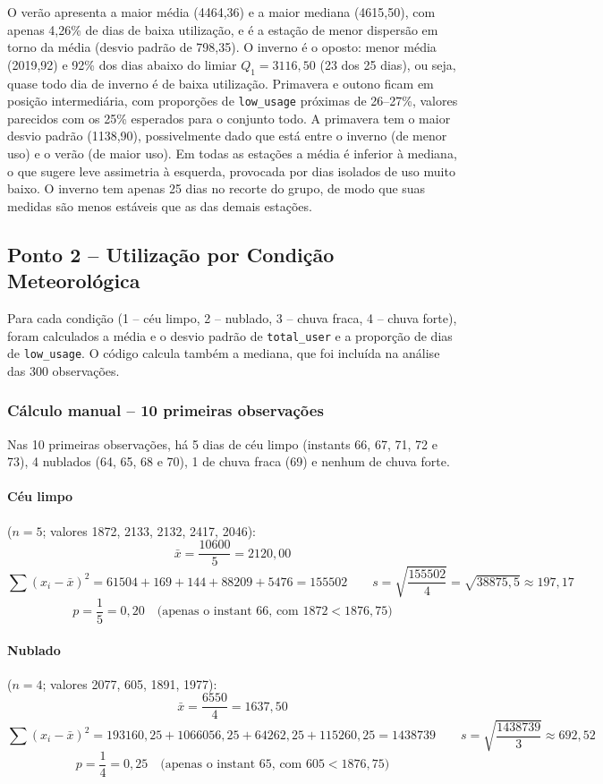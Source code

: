 \documentclass[10pt, a4paper]{article}
\begin{document}
O verão apresenta a maior média (4464,36) e a maior mediana (4615,50), com apenas 4,26\% de dias de baixa utilização, e é a estação de menor dispersão em torno da média (desvio padrão de 798,35). O inverno é o oposto: menor média (2019,92) e 92\% dos dias abaixo do limiar $Q_1 = 3116{,}50$ (23 dos 25 dias), ou seja, quase todo dia de inverno é de baixa utilização. Primavera e outono ficam em posição intermediária, com proporções de \texttt{low\_usage} próximas de 26--27\%, valores parecidos com os 25\% esperados para o conjunto todo. A primavera tem o maior desvio padrão (1138,90), possivelmente dado que está entre o inverno (de menor uso) e o verão (de maior uso). Em todas as estações a média é inferior à mediana, o que sugere leve assimetria à esquerda, provocada por dias isolados de uso muito baixo. O inverno tem apenas 25 dias no recorte do grupo, de modo que suas medidas são menos estáveis que as das demais estações.

\clearpage
\subsection{Ponto 2 -- Utilização por Condição Meteorológica}

Para cada condição (1 -- céu limpo, 2 -- nublado, 3 -- chuva fraca, 4 -- chuva forte), foram calculados a média e o desvio padrão de \texttt{total\_user} e a proporção de dias de \texttt{low\_usage}. O código calcula também a mediana, que foi incluída na análise das 300 observações.

\subsubsection{Cálculo manual -- 10 primeiras observações}

Nas 10 primeiras observações, há 5 dias de céu limpo (instants 66, 67, 71, 72 e 73), 4 nublados (64, 65, 68 e 70), 1 de chuva fraca (69) e nenhum de chuva forte.

\paragraph{Céu limpo} ($n = 5$; valores 1872, 2133, 2132, 2417, 2046):
\[
\bar{x} = \frac{10600}{5} = 2120{,}00
\]
\[
\sum (x_i - \bar{x})^2 = 61504 + 169 + 144 + 88209 + 5476 = 155502 \qquad s = \sqrt{\frac{155502}{4}} = \sqrt{38875{,}5} \approx 197{,}17
\]
\[
p = \frac{1}{5} = 0{,}20 \quad \text{(apenas o instant 66, com } 1872 < 1876{,}75\text{)}
\]

\paragraph{Nublado} ($n = 4$; valores 2077, 605, 1891, 1977):
\[
\bar{x} = \frac{6550}{4} = 1637{,}50
\]
\[
\sum (x_i - \bar{x})^2 = 193160{,}25 + 1066056{,}25 + 64262{,}25 + 115260{,}25 = 1438739 \qquad s = \sqrt{\frac{1438739}{3}} \approx 692{,}52
\]
\[
p = \frac{1}{4} = 0{,}25 \quad \text{(apenas o instant 65, com } 605 < 1876{,}75\text{)}
\]
\end{document}
